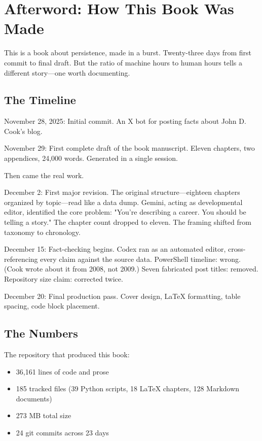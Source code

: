 \chapter*{Afterword: How This Book Was Made}

This is a book about persistence, made in a burst. Twenty-three days from first commit to final draft. But the ratio of machine hours to human hours tells a different story—one worth documenting.

\bigskip

\section*{The Timeline}

November 28, 2025: Initial commit. An X bot for posting facts about John D. Cook's blog.

November 29: First complete draft of the book manuscript. Eleven chapters, two appendices, 24,000 words. Generated in a single session.

Then came the real work.

December 2: First major revision. The original structure—eighteen chapters organized by topic—read like a data dump. Gemini, acting as developmental editor, identified the core problem: "You're describing a career. You should be telling a story." The chapter count dropped to eleven. The framing shifted from taxonomy to chronology.

December 15: Fact-checking begins. Codex ran as an automated editor, cross-referencing every claim against the source data. PowerShell timeline: wrong. (Cook wrote about it from 2008, not 2009.) Seven fabricated post titles: removed. Repository size claim: corrected twice.

December 20: Final production pass. Cover design, LaTeX formatting, table spacing, code block placement.

\bigskip

\section*{The Numbers}

The repository that produced this book:

\begin{itemize}
\item 36,161 lines of code and prose
\item 185 tracked files (39 Python scripts, 18 LaTeX chapters, 128 Markdown documents)
\item 273 MB total size
\item 24 git commits across 23 days
\end{itemize}

